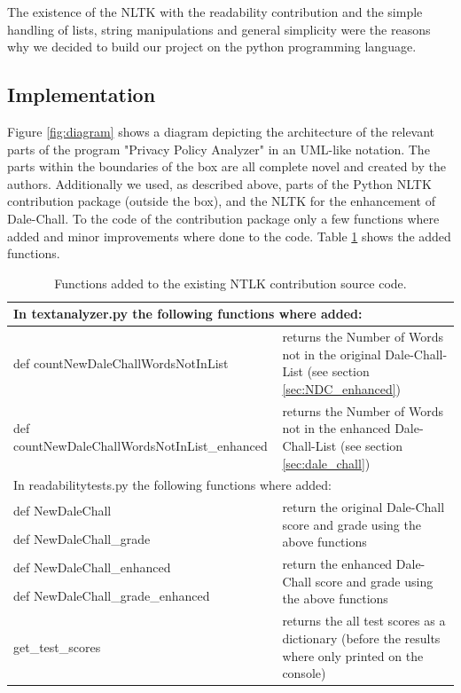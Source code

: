 \documentclass[runningheads,a4paper]{llncs}
\begin{document}
The existence of the NLTK with the readability contribution and the simple handling of lists, string manipulations and general simplicity were the reasons why we decided to build our project on the python programming language.

\subsection{Implementation}\label{sec:implementation}

Figure \ref{fig:diagram} shows a diagram depicting the architecture of the relevant parts of the program "Privacy Policy Analyzer" in an UML-like notation. The parts within the boundaries of the box are all complete novel and created by the authors. Additionally we used, as described above, parts of the Python NLTK contribution package (outside the box), and the NLTK for the enhancement of Dale-Chall. To the code of the contribution package only a few functions where added and minor improvements where done to the code. Table \ref{tab:textanalyzer} shows the added functions.


\begin{table}[htbp]
  \centering
  \caption{Functions added to the existing NTLK contribution source code.}
    \begin{tabular}{p{5cm}p{7cm}}
    \toprule
    \multicolumn{2}{l}{In textanalyzer.py the following functions where added:}  \\
    \midrule
    def countNewDaleChallWordsNotInList & returns the Number of Words not in the original Dale-Chall-List (see section \ref{sec:NDC_enhanced}) \\
    def countNewDaleChallWordsNotInList\_enhanced & returns the Number of Words not in the enhanced Dale-Chall-List (see section \ref{sec:dale_chall}) \\
    \midrule
    \multicolumn{2}{l}{In readabilitytests.py the following functions where added:}  \\
    \midrule
    def NewDaleChall & \multirow{2}[0]{*}{\parbox[t]{7cm}{return the original Dale-Chall score and grade using the above functions}} \\
    def NewDaleChall\_grade &  \\
    def NewDaleChall\_enhanced & \multirow{2}[0]{*}{\parbox[t]{7cm}{return the enhanced Dale-Chall score and grade using the above functions}} \\
    def NewDaleChall\_grade\_enhanced &  \\
    get\_test\_scores & returns the all test scores as a dictionary (before the results where only printed on the console) \\
    \bottomrule
    \end{tabular}%
  \label{tab:textanalyzer}%
\end{table}%
\end{document}
